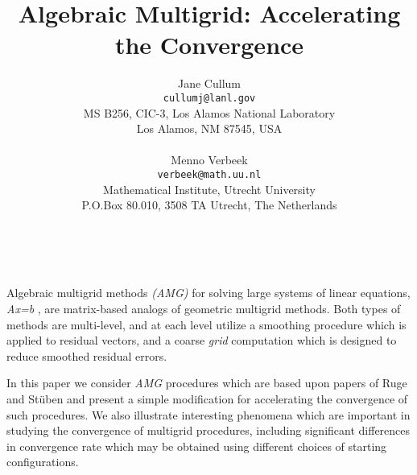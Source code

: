 \documentclass[11pt]{article}
\date{ ~ \hspace{-4mm}}
\title{Algebraic Multigrid: Accelerating the Convergence  }
\author{Jane Cullum \\ {\tt cullumj@lanl.gov} \\ MS B256, CIC-3, Los Alamos National Laboratory \\ Los Alamos, NM 87545, USA \\ \\ Menno Verbeek \\ {\tt verbeek@math.uu.nl} \\ Mathematical Institute, Utrecht University \\ P.O.Box 80.010, 3508 TA Utrecht, The Netherlands}
\begin{document}
\maketitle
\thispagestyle{empty}





Algebraic multigrid methods
{\em 
(AMG)
}
for
solving large systems of linear equations,
{\em 
Ax=b
}
,
are  matrix-based analogs of geometric 
multigrid methods. 
Both types of methods are multi-level, and
at each level utilize a smoothing procedure
which is applied to residual vectors, and  a coarse
{\em 
grid
} 
computation which is designed
to reduce smoothed residual errors. 




In this paper we consider
{\em 
AMG
}
procedures
which are based upon papers of Ruge and St\"{u}ben and
present a simple modification for accelerating the
convergence of such procedures. We also illustrate
interesting phenomena which are important in
studying the convergence of multigrid procedures, 
including significant differences in convergence rate 
which may be obtained using different choices of starting configurations.
\end{document}
